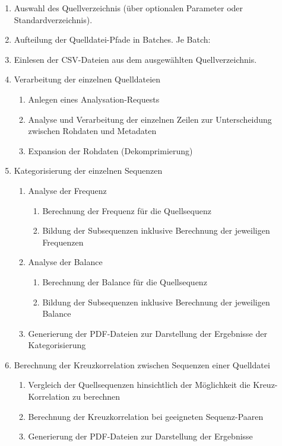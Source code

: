 \begin{enumerate}[nolistsep]
	\item Auswahl des Quellverzeichnis (über optionalen Parameter oder Standardverzeichnis).
	\item Aufteilung der Quelldatei-Pfade in Batches. Je Batch:
	\item Einlesen der CSV-Dateien aus dem ausgewählten Quellverzeichnis.
	\item Verarbeitung der einzelnen Quelldateien
	\begin{enumerate}[nolistsep]
		\item Anlegen eines Analysation-Requests
		\item Analyse und Verarbeitung der einzelnen Zeilen zur Unterscheidung zwischen Rohdaten und Metadaten
		\item Expansion der Rohdaten (Dekomprimierung)
	\end{enumerate}
	\item Kategorisierung der einzelnen Sequenzen
	\begin{enumerate}[nolistsep]
		\item Analyse der Frequenz
		\begin{enumerate}[nolistsep]
			\item Berechnung der Frequenz für die Quellsequenz
			\item Bildung der Subsequenzen inklusive Berechnung der jeweiligen Frequenzen
		\end{enumerate}
		\item Analyse der Balance
			\begin{enumerate}[nolistsep]
			\item Berechnung der Balance für die Quellsequenz
			\item Bildung der Subsequenzen inklusive Berechnung der jeweiligen Balance
		\end{enumerate}
		\item Generierung der PDF-Dateien zur Darstellung der Ergebnisse der Kategorisierung
	\end{enumerate}
	\item Berechnung der Kreuzkorrelation zwischen Sequenzen einer Quelldatei
	\begin{enumerate}[nolistsep]
		\item Vergleich der Quellsequenzen hinsichtlich der Möglichkeit die Kreuz-Korrelation zu berechnen
		\item Berechnung der Kreuzkorrelation bei geeigneten Sequenz-Paaren
		\item Generierung der PDF-Dateien zur Darstellung der Ergebnisse
	\end{enumerate}
\end{enumerate}

